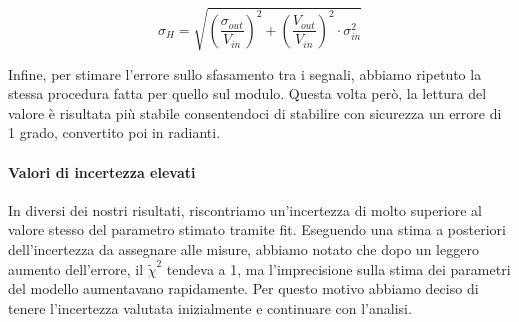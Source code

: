 \documentclass[letterpaper,12pt]{article}
\begin{document}
$$\sigma_H = \sqrt{\left(\frac{\sigma_{out}}{V_{in}}\right)^2 + \left(\frac{V_{out}}{V_{in}}\right)^2 \cdot \sigma_{in}^2}$$

Infine, per stimare l'errore sullo sfasamento tra i segnali, abbiamo ripetuto la stessa procedura fatta per quello sul modulo. Questa volta però, la lettura del valore è risultata più stabile consentendoci di stabilire con sicurezza un errore di 1 grado, convertito poi in radianti. \\

\paragraph{Valori di incertezza elevati} In diversi dei nostri risultati, riscontriamo un'incertezza di molto superiore al valore stesso del parametro stimato tramite fit.
Eseguendo una stima a posteriori dell'incertezza da assegnare alle misure, abbiamo notato che dopo un leggero aumento dell'errore, il $\widetilde\chi^2$ tendeva a 1, ma l'imprecisione sulla stima dei parametri del modello aumentavano rapidamente. Per questo motivo abbiamo deciso di tenere l'incertezza valutata inizialmente e continuare con l'analisi.

\newpage
\end{document}
